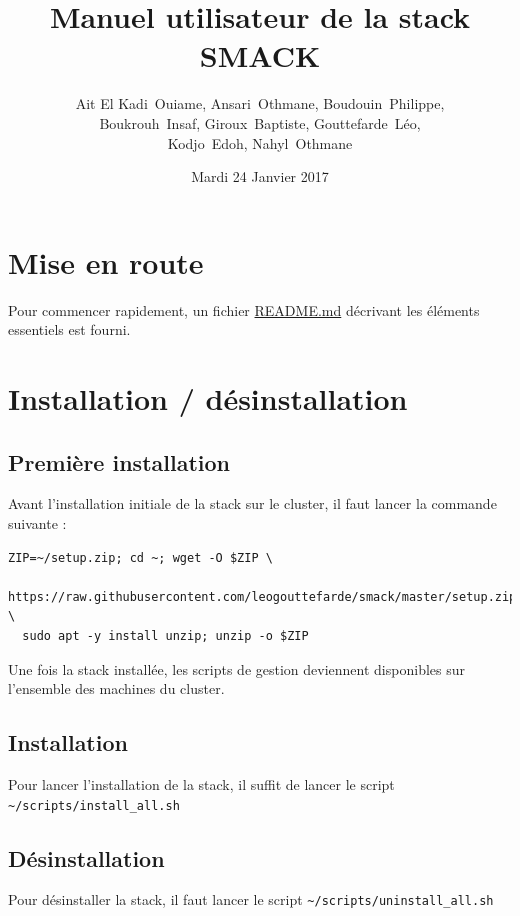 \documentclass[a4paper, 11pt, titlepage]{article}
\title {{ {\huge Manuel utilisateur de la stack SMACK }} }
\author{%
    {\sc Ait El Kadi}~Ouiame,
    {\sc Ansari}~Othmane,
    {\sc Boudouin}~Philippe,\\
    {\sc Boukrouh}~Insaf,
    {\sc Giroux}~Baptiste,
    {\sc Gouttefarde}~Léo,\\
    {\sc Kodjo}~Edoh,
    {\sc Nahyl}~Othmane
}
\date{Mardi 24 Janvier 2017}
\begin{document}
\pagestyle{fancy}
\maketitle

\setcounter{tocdepth}{2}

\tableofcontents
\newpage


\section {Mise en route}

Pour commencer rapidement, un fichier \href{https://github.com/leogouttefarde/smack/blob/master/README.md}{README.md} décrivant les éléments essentiels est fourni.


\section {Installation / désinstallation}

\subsection {Première installation}

Avant l'installation initiale de la stack sur le cluster, il faut lancer la commande suivante :

\begin{verbatim}
ZIP=~/setup.zip; cd ~; wget -O $ZIP \
  https://raw.githubusercontent.com/leogouttefarde/smack/master/setup.zip; \
  sudo apt -y install unzip; unzip -o $ZIP
\end{verbatim}

Une fois la stack installée, les scripts de gestion deviennent disponibles sur l'ensemble des machines du cluster.


\subsection {Installation}

Pour lancer l'installation de la stack, il suffit de lancer le script \lstinline!~/scripts/install_all.sh!


\subsection {Désinstallation}

Pour désinstaller la stack, il faut lancer le script \lstinline!~/scripts/uninstall_all.sh!
\end{document}
